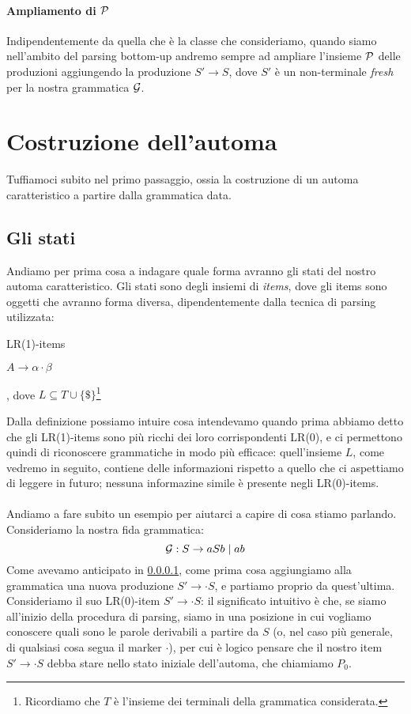 \documentclass[class=book, crop=false, oneside, 12pt]{standalone}
\begin{document}
\paragraph{Ampliamento di \(\P\)}
\label{par:p-newprod}
 Indipendentemente da quella che è la classe che consideriamo, quando siamo nell'ambito del parsing bottom-up andremo sempre ad ampliare l'insieme \(\P\) delle produzioni aggiungendo la produzione \(S' \to S\), dove \(S'\) è un non-terminale \emph{fresh} per la nostra grammatica \(\G\).

\section{Costruzione dell'automa}
Tuffiamoci subito nel primo passaggio, ossia la costruzione di un automa caratteristico a partire dalla grammatica data.

\subsection{Gli stati}
Andiamo per prima cosa a indagare quale forma avranno gli stati del nostro automa caratteristico. Gli stati sono degli insiemi di \emph{items}, dove gli items sono oggetti che avranno forma diversa, dipendentemente dalla tecnica di parsing utilizzata:
\begin{labeling}{LR(1)-items}
    \item[LR(0)-items] \(A \to \alpha \cdot \beta\)
    \item[LR(1)-items] [\(A \to \alpha \cdot \beta, L\)], dove \(L \subseteq T \cup \{\$\}\)\footnote{Ricordiamo che \(T\) è l'insieme dei terminali della grammatica considerata.}
\end{labeling}
Dalla definizione possiamo intuire cosa intendevamo quando prima abbiamo detto che gli LR(1)-items sono più ricchi dei loro corrispondenti LR(0), e ci permettono quindi di riconoscere grammatiche in modo più efficace: quell'insieme \(L\), come vedremo in seguito, contiene delle informazioni rispetto a quello che ci aspettiamo di leggere in futuro; nessuna informazine simile è presente negli LR(0)-items.

\paragraph{}
Andiamo a fare subito un esempio per aiutarci a capire di cosa stiamo parlando. Consideriamo la nostra fida grammatica:
\begin{equation}
    \label{eq:balanced}
    \G: S \to aSb \mid ab
\end{equation}
Come avevamo anticipato in \ref{par:p-newprod}, come prima cosa aggiungiamo alla grammatica una nuova produzione \(S' \to \cdot S\), e partiamo proprio da quest'ultima. Consideriamo il suo LR(0)-item \(S' \to \cdot S\): il significato intuitivo è che, se siamo all'inizio della procedura di parsing, siamo in una posizione in cui vogliamo conoscere quali sono le parole derivabili a partire da \(S\) (o, nel caso più generale, di qualsiasi cosa segua il marker \(\cdot\)), per cui è logico pensare che il nostro item \(S' \to \cdot S\) debba stare nello stato iniziale dell'automa, che chiamiamo \(P_0\).
\end{document}
